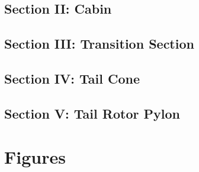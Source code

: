 \documentclass[letterpaper,11pt,openany,oneside]{book}
\begin{document}
\section{Section II: Cabin}

\clearpage
\section{Section III: Transition Section}

\clearpage
\section{Section IV: Tail Cone}

\clearpage
\section{Section V: Tail Rotor Pylon}


\renewcommand{\thefigure}{\arabic{figure}}
\setcounter{figure}{0}
\captionsetup{format=hang,labelformat=default,labelsep=endash}
\chapter{Figures}

\end{document}
